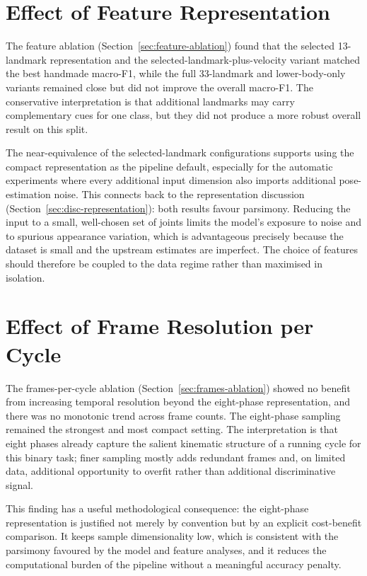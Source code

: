 \section{Effect of Feature Representation}
\label{sec:disc-feature}

The feature ablation (Section~\ref{sec:feature-ablation}) found that the
selected 13-landmark representation and the selected-landmark-plus-velocity
variant matched the best handmade macro-F1, while the full 33-landmark and
lower-body-only variants remained close but did not improve the overall
macro-F1. The conservative interpretation is that additional landmarks may
carry complementary cues for one class, but they did not produce a more robust
overall result on this split.

The near-equivalence of the selected-landmark
configurations supports using the compact representation as the pipeline
default, especially for the automatic experiments where every additional input
dimension also imports additional pose-estimation noise. This connects back to the representation discussion
(Section~\ref{sec:disc-representation}): both results favour parsimony.
Reducing the input to a small, well-chosen set of joints limits the model's
exposure to noise and to spurious appearance variation, which is advantageous
precisely because the dataset is small and the upstream estimates are imperfect.
The choice of features should therefore be coupled to the data regime rather
than maximised in isolation.

\section{Effect of Frame Resolution per Cycle}
\label{sec:disc-frames}

The frames-per-cycle ablation (Section~\ref{sec:frames-ablation}) showed no
benefit from increasing temporal resolution beyond the eight-phase
representation, and there was no monotonic trend across frame counts. The
eight-phase sampling remained the strongest and most compact setting. The
interpretation is that eight phases already capture the salient kinematic
structure of a running cycle for this binary task; finer sampling mostly adds
redundant frames and, on limited data, additional opportunity to overfit rather
than additional discriminative signal.

This finding has a useful methodological consequence: the eight-phase
representation is justified not merely by convention but by an explicit
cost-benefit comparison. It keeps sample dimensionality low, which is
consistent with the parsimony favoured by the model and feature analyses, and
it reduces the computational burden of the pipeline without a meaningful
accuracy penalty.

